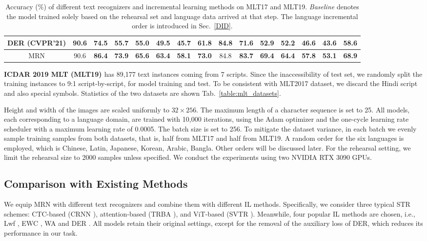 \documentclass[10pt,twocolumn,letterpaper]{article}
\begin{document}
\begin{table*}[]
\begin{center}
{\begin{tabular}{ccccccccccccccc}
\multicolumn{1}{c|}{DER (CVPR'21)\cite{Yan2021DER}}      & 90.6 & 74.5          & 55.7          & 55.0          & 49.5          & 45.7          & \multicolumn{1}{c|}{61.8}          & 84.8 & 71.6          & 52.9          & 52.2          & 46.6          & 43.6          & 58.6          \\ \hline
\multicolumn{1}{c|}{MRN}     & 90.6 & \textbf{86.4} & \textbf{73.9} & \textbf{65.6} & \textbf{63.4} & \textbf{58.1} & \multicolumn{1}{c|}{\textbf{73.0}} & 84.8 & \textbf{83.7} & \textbf{69.4} & \textbf{64.4} & \textbf{57.8} & \textbf{53.1} & \textbf{68.9} \\ \hline
\end{tabular}
}
\end{center}
\caption{Accuracy (\%) of different text recognizers and incremental learning methods on MLT17 and MLT19. \emph{Baseline} denotes the model trained solely based on the rehearsal set and language data arrived at that step. The language incremental order is introduced in Sec.~\ref{DID}.
}
\label{table:sota}
\end{table*}



\noindent\textbf{ICDAR 2019 MLT (MLT19) \cite{nayef2019mlt2019}} has 89,177 text instances coming from 7 scripts. Since the inaccessibility of test set, we randomly split the training instances to 9:1 script-by-script, for model training and test. To be consistent with MLT2017 dataset, we discard the Hindi script and also special symbols. Statistics of the two datasets are shown Tab.~\ref{table:mlt_datasets}.

Height and width of the images are scaled uniformly to $32\times256$. The maximum length of a character sequence is set to 25. All models, each corresponding to a language domain, are trained with 10,000 iterations, using the Adam optimizer and the one-cycle learning rate scheduler \cite{smith2019super} with a maximum learning rate of 0.0005. The batch size is set to 256. To mitigate the dataset variance, in each batch we evenly sample training samples from both datasets, that is, half from MLT17 and half from MLT19. A random order for the six languages is employed, which is Chinese, Latin, Japanese, Korean, Arabic, Bangla. Other orders will be discussed later. For the rehearsal setting, we limit the rehearsal size to 2000 samples unless specified. We conduct the experiments using two NVIDIA RTX 3090 GPUs.

\subsection{Comparison with Existing Methods}
We equip MRN with different text recognizers and combine them with different IL methods. Specifically, we consider three typical STR schemes: CTC-based (CRNN \cite{ShiBY17crnn}), attention-based (TRBA \cite{Baekwhats_wrong_19ICCV}), and ViT-based (SVTR \cite{du2022@svtr}). Meanwhile, four popular IL methods are chosen, i.e., Lwf \cite{Li2017LWF}, EWC \cite{kirkpatrick2017ewc}, WA \cite{zhao2020wa} and DER \cite{Yan2021DER}. All models retain their original settings, except for the removal of the auxiliary loss of DER, which reduces its performance in our task.
\end{document}
